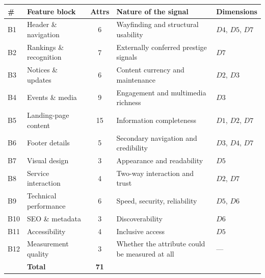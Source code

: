 \begin{tabular}{llcp{5.0cm}l}
\toprule
\textbf{\#} & \textbf{Feature block} & \textbf{Attrs} & \textbf{Nature of the signal} & \textbf{Dimensions} \\
\midrule
B1 & Header \& navigation & 6 & \small Wayfinding and structural usability & $D4$, $D5$, $D7$ \\
B2 & Rankings \& recognition & 7 & \small Externally conferred prestige signals & $D7$ \\
B3 & Notices \& updates & 6 & \small Content currency and maintenance & $D2$, $D3$ \\
B4 & Events \& media & 9 & \small Engagement and multimedia richness & $D3$ \\
B5 & Landing-page content & 15 & \small Information completeness & $D1$, $D2$, $D7$ \\
B6 & Footer details & 5 & \small Secondary navigation and credibility & $D3$, $D4$, $D7$ \\
B7 & Visual design & 3 & \small Appearance and readability & $D5$ \\
B8 & Service interaction & 4 & \small Two-way interaction and trust & $D2$, $D7$ \\
B9 & Technical performance & 6 & \small Speed, security, reliability & $D5$, $D6$ \\
B10 & SEO \& metadata & 3 & \small Discoverability & $D6$ \\
B11 & Accessibility & 4 & \small Inclusive access & $D5$ \\
B12 & Measurement quality & 3 & \small Whether the attribute could be measured at all & --- \\
\midrule
& \textbf{Total} & \textbf{71} & & \\
\bottomrule
\end{tabular}
